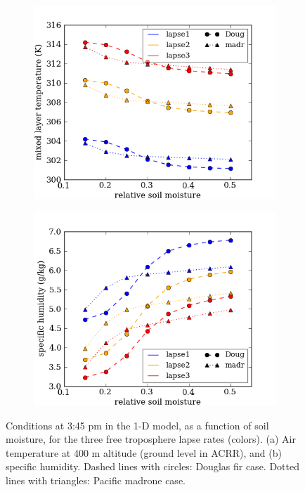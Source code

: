 \begin{figure}[here]
\begin{subfigure}{0.5\textwidth}
\includegraphics[width=\textwidth]{ch2-BL/figures/all_afternoon_T.png}
\caption{}
\end{subfigure}
\begin{subfigure}{0.5\textwidth}
\includegraphics[width=\textwidth]{ch2-BL/figures/all_afternoon_Q.png}
\caption{}
\end{subfigure}
\caption{Conditions at 3:45 pm in the 1-D model, as a function of soil moisture, for the three free troposphere lapse rates (colors).  (a) Air temperature at 400 m altitude (ground level in ACRR), and (b) specific humidity.  Dashed lines with circles: Douglas fir case.  Dotted lines with triangles: Pacific madrone case.}
\label{fig:BL_345changes}
\end{figure}

